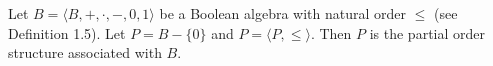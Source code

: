 Let $B = \langle B, +, \cdot, -, 0, 1 \rangle$ be a Boolean algebra with natural order $\leq$ (see Definition 1.5). Let $P = B - \{0\}$ and $P = \langle P, \leq \rangle$. Then $P$ is the partial order structure associated with $B$.
